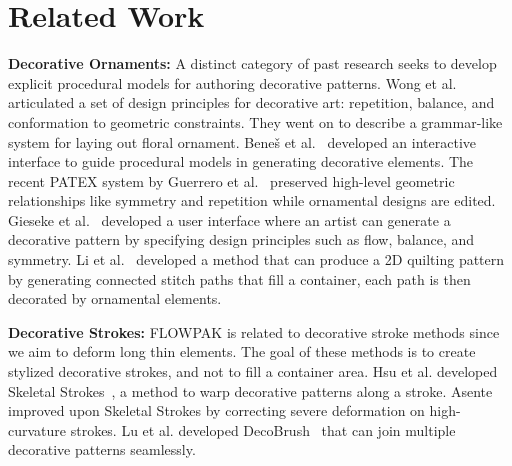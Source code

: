 \section{Related Work}
\label{flowpak_previous_work}




\newtext
{
\textbf{Decorative Ornaments:} A distinct category of past research seeks to develop explicit procedural
models for authoring decorative patterns.  Wong et al.~\cite{Wong1998}
articulated a set of design principles for decorative art:
repetition, balance, and conformation to geometric constraints.  They
went on to describe a grammar-like system for laying out floral ornament.
Bene\v{s} et al.~\cite{Benes2011} developed an interactive 
interface to guide procedural models in generating decorative elements.
The recent PATEX system by Guerrero 
et al.~\cite{Guerrero2016} preserved high-level geometric relationships
like symmetry and repetition while ornamental designs are edited.
Gieseke et al.~\cite{Gieseke2017} developed a user interface where an artist 
can generate a decorative pattern by specifying design principles such as flow, balance, and symmetry.
Li et al.~\cite{Li2019} developed a method that can produce a 2D quilting pattern
by generating connected stitch paths that fill a container, 
each path is then decorated by ornamental elements.
}

\newtext
{
\textbf{Decorative Strokes:}
FLOWPAK is related to decorative stroke methods since we aim to deform long thin elements. 
The goal of these methods is to create stylized decorative strokes, and not to fill a container area. 
Hsu et al. developed Skeletal Strokes~\cite{Hsu1993}, a method to warp decorative patterns along a stroke.
Asente~\cite{Asente2010} improved upon Skeletal Strokes by correcting severe deformation on high-curvature strokes.
Lu et al. developed DecoBrush~\cite{Lu2014} that can join multiple decorative patterns seamlessly.
}

